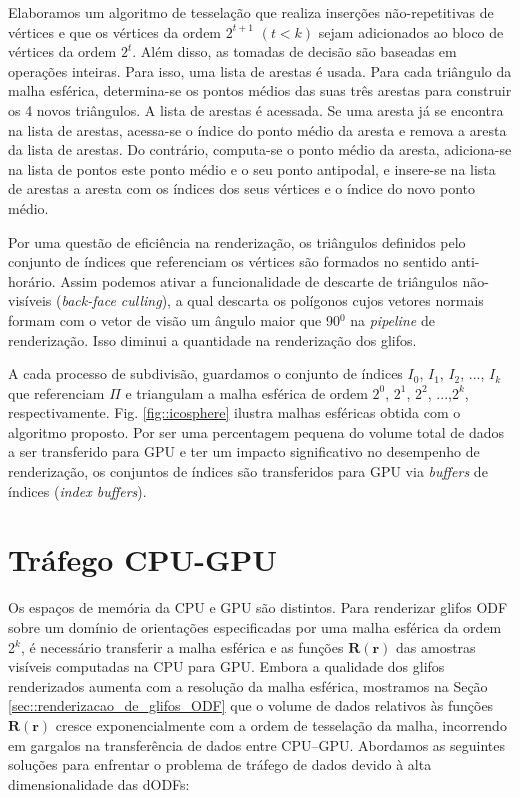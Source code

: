 
Elaboramos um algoritmo de tesselação que realiza inserções não-repetitivas de vértices e que os vértices da ordem $2^{t+1}$ $(t < k)$ sejam adicionados ao bloco de vértices da ordem $2^t$. Além disso, as tomadas de decisão são baseadas em operações inteiras. Para isso, uma lista de arestas é usada. Para cada triângulo da malha esférica, determina-se os pontos médios das suas três arestas para construir os 4 novos triângulos. A lista de arestas é acessada. Se uma aresta já se encontra na lista de arestas, acessa-se o índice do ponto médio da aresta e remova a aresta da lista de arestas. Do contrário, computa-se o ponto médio da aresta, adiciona-se na lista de pontos este ponto médio e o seu ponto antipodal, e insere-se na lista de arestas a aresta com os índices dos seus vértices e o índice do novo ponto médio.

Por uma questão de eficiência na renderização, os triângulos definidos pelo conjunto de índices que referenciam os vértices são formados no sentido anti-horário. Assim podemos ativar a funcionalidade de descarte de triângulos não-visíveis (\textit{back-face culling}), a qual descarta os polígonos cujos vetores normais formam com o vetor de visão um ângulo maior que 90$^0$ na \textit{pipeline} de renderização. Isso diminui a quantidade na renderização dos glifos.

A cada processo de subdivisão, guardamos o conjunto de índices $I_0$, $I_1$, $I_2$, ..., $I_k$ que referenciam $\Pi$ e triangulam a malha esférica de ordem $2^0$, $2^1$, $2^2$, ...,$2^k$, respectivamente. Fig. \ref{fig::icosphere} ilustra malhas esféricas obtida com o algoritmo proposto. Por ser uma percentagem pequena do volume total de dados a ser transferido para GPU e ter um impacto significativo no desempenho de renderização, os conjuntos de índices são transferidos para GPU via \textit{buffers} de índices (\textit{index buffers}).
\section{Tráfego CPU-GPU}
\label{sec::trafego_cpu_gpu}

Os espaços de memória da CPU e GPU são distintos. Para renderizar glifos ODF sobre um domínio de orientações especificadas por uma malha esférica da ordem 2$^k$, é necessário transferir a malha esférica e as funções  $\mathbf{R}(\mathbf{r})$ das amostras visíveis computadas na CPU para GPU. Embora a qualidade dos glifos renderizados aumenta com a resolução da malha esférica, mostramos na Seção \ref{sec::renderizacao_de_glifos_ODF} que o volume de dados relativos às funções $\mathbf{R}(\mathbf{r})$ cresce exponencialmente com a ordem de tesselação da malha, incorrendo em gargalos na transferência de dados entre CPU--GPU. Abordamos as seguintes soluções para enfrentar o problema de tráfego de dados devido à alta dimensionalidade das dODFs:

